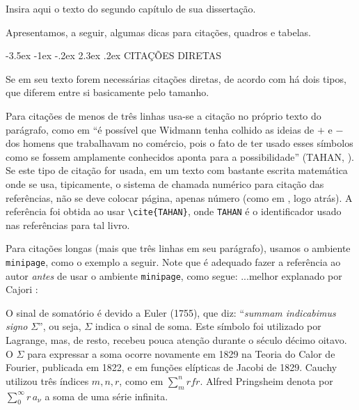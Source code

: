 \documentclass[a4paper,12pt]{report}%
\makeatletter
\newcommand{\secfnt}{\fontsize{12}{12}}
\renewcommand\section{\@startsection {section}{1}{\z@}%
                  {-3.5ex \@plus -1ex \@minus -.2ex}%
                  {2.3ex \@plus.2ex}%
                  {\normalfont\secfnt}}
\makeatother
\begin{document}
\thispagestyle{myheadings}

\hspace{0.5cm}
Insira aqui o texto do segundo capítulo de sua dissertação.

\vspace{0.3cm}
Apresentamos, a seguir, algumas dicas para citações, quadros e tabelas.

\section{CITAÇÕES DIRETAS}\label{Sec2.1}

\hspace{0.5cm}
Se em seu texto forem necessárias citações diretas, de acordo com \cite{UEPG} há dois tipos, que diferem entre si basicamente pelo tamanho. 

Para citações de menos de três linhas usa-se a citação no próprio texto do parágrafo, como em 
``é possível que Widmann tenha colhido as ideias de $+$ e $-$ 
dos homens que trabalhavam no comércio, pois  o fato de ter usado esses símbolos como se fossem amplamente conhecidos aponta para a possibilidade''
(TAHAN, \cite{TAHAN}). Se este tipo de citação for usada, em um texto com bastante escrita matemática onde se usa, tipicamente, o sistema de chamada numérico para citação das referências, não se deve colocar página, apenas número (como em \cite{TAHAN}, logo atrás). A referência \cite{TAHAN} foi obtida ao usar \verb|\cite{TAHAN}|, onde \verb|TAHAN| é o identificador usado nas referências para tal livro.

Para citações longas (mais que três linhas em seu parágrafo), usamos o ambiente \verb|minipage|, como o exemplo a seguir. Note que é adequado fazer a referência ao autor {\it antes} de usar o ambiente \verb|minipage|, como segue: ...melhor explanado por Cajori \cite{CAJORI}:
\vspace{-1.2cm}
\begin{flushright}
	\hspace{6cm}
	\begin{minipage}[t]{12cm}
		{\small
			\begin{singlespace}
				O sinal de somatório é devido a Euler (1755), que diz: ``{\it summam indicabimus signo }$\Sigma$'', ou seja, $\Sigma$ indica o sinal de soma. Este símbolo foi utilizado por Lagrange, mas, de resto, recebeu pouca atenção durante o século décimo oitavo. O $\Sigma$ para expressar a soma ocorre novamente em 1829 na Teoria do Calor de Fourier, publicada em 1822, e em funções elípticas de Jacobi de 1829. Cauchy utilizou três índices $m, n, r$, como em $\displaystyle \sum_m^n \!\! r fr$. Alfred Pringsheim denota por $\displaystyle \sum_0^{\infty} \!\!\! r \, a_{\nu}$ a soma de uma série infinita. 
			\end{singlespace}
		}
	\end{minipage}
\end{flushright}
\end{document}
